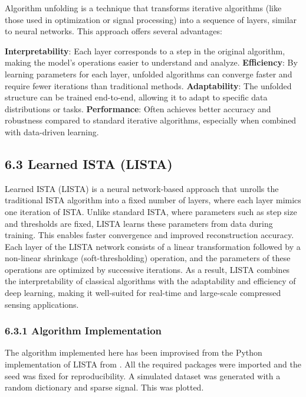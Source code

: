 \documentclass[
  letterpaper,
  DIV=11,
  numbers=noendperiod]{scrartcl}
\begin{document}
Algorithm unfolding is a technique that transforms iterative algorithms
(like those used in optimization or signal processing) into a sequence
of layers, similar to neural networks. This approach offers several
advantages:

\textbf{Interpretability}: Each layer corresponds to a step in the
original algorithm, making the model's operations easier to understand
and analyze. \textbf{Efficiency}: By learning parameters for each layer,
unfolded algorithms can converge faster and require fewer iterations
than traditional methods. \textbf{Adaptability}: The unfolded structure
can be trained end-to-end, allowing it to adapt to specific data
distributions or tasks. \textbf{Performance}: Often achieves better
accuracy and robustness compared to standard iterative algorithms,
especially when combined with data-driven learning.

\subsection{6.3 Learned ISTA (LISTA)}\label{learned-ista-lista}

Learned ISTA (LISTA) is a neural network-based approach that unrolls the
traditional ISTA algorithm into a fixed number of layers, where each
layer mimics one iteration of ISTA. Unlike standard ISTA, where
parameters such as step size and thresholds are fixed, LISTA learns
these parameters from data during training. This enables faster
convergence and improved reconstruction accuracy. Each layer of the
LISTA network consists of a linear transformation followed by a
non-linear shrinkage (soft-thresholding) operation, and the parameters
of these operations are optimized by successive iterations. As a result,
LISTA combines the interpretability of classical algorithms with the
adaptability and efficiency of deep learning, making it well-suited for
real-time and large-scale compressed sensing applications.

\subsubsection{6.3.1 Algorithm
Implementation}\label{algorithm-implementation-2}

The algorithm implemented here has been improvised from the Python
implementation of LISTA from
\autocite{shlezinger_modelbaseddeeplearning}. All the required packages
were imported and the seed was fixed for reproducibility. A simulated
dataset was generated with a random dictionary and sparse signal. This
was plotted.
\end{document}
